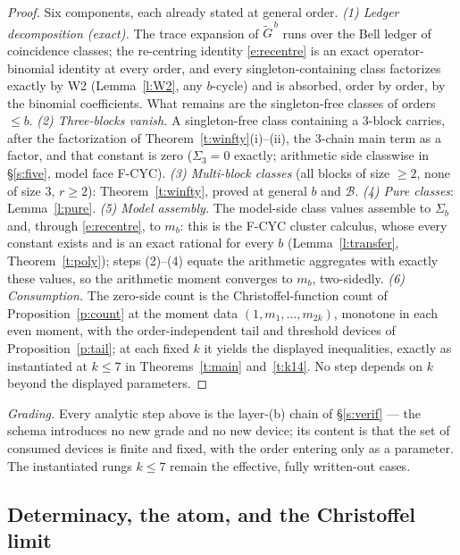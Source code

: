 \documentclass[11pt]{article}
\numberwithin{equation}{section}
\theoremstyle{definition}
\theoremstyle{remark}
\begin{document}
\begin{proof}
Six components, each already stated at general order.
\emph{(1) Ledger decomposition (exact).} The trace expansion
of $\widetilde G^{\,b}$ runs over the Bell ledger of
coincidence classes; the re-centring identity
\eqref{e:recentre} is an exact operator-binomial identity at
every order, and every singleton-containing class factorizes
exactly by W2 (Lemma~\ref{l:W2}, any $b$-cycle) and is
absorbed, order by order, by the binomial coefficients. What
remains are the singleton-free classes of orders $\le b$.
\emph{(2) Three-blocks vanish.} A singleton-free class
containing a $3$-block carries, after the factorization of
Theorem~\ref{t:winfty}(i)--(ii), the $3$-chain main term as
a factor, and that constant is zero ($\Sigma_3=0$ exactly;
arithmetic side classwise in \S\ref{s:five}, model face
F-CYC). \emph{(3) Multi-block classes} (all blocks of size
$\ge2$, none of size $3$, $r\ge2$): Theorem~\ref{t:winfty},
proved at general $b$ and $\mathcal B$. \emph{(4) Pure
classes}: Lemma~\ref{l:pure}. \emph{(5) Model assembly.}
The model-side class values assemble to $\Sigma_b$ and,
through \eqref{e:recentre}, to $m_b$: this is the F-CYC
cluster calculus, whose every constant exists and is an
exact rational for every $b$ (Lemma~\ref{l:transfer},
Theorem~\ref{t:poly}); steps (2)--(4) equate the arithmetic
aggregates with exactly these values, so the arithmetic
moment converges to $m_b$, two-sidedly. \emph{(6)
Consumption.} The zero-side count is the
Christoffel-function count of Proposition~\ref{p:count} at
the moment data $(1,m_1,\dots,m_{2k})$, monotone in each
even moment, with the order-independent tail and threshold
devices of Proposition~\ref{p:tail}; at each fixed $k$ it
yields the displayed inequalities, exactly as instantiated
at $k\le7$ in Theorems~\ref{t:main} and~\ref{t:k14}. No
step depends on $k$ beyond the displayed parameters.
\end{proof}

\noindent\emph{Grading.} Every analytic step above is the
layer-(b) chain of \S\ref{s:verif} --- the schema introduces
no new grade and no new device; its content is that the set
of consumed devices is finite and fixed, with the order
entering only as a parameter. The instantiated rungs
$k\le7$ remain the effective, fully written-out cases.

\subsection{Determinacy, the atom, and the Christoffel
limit}\label{s:soft}
\end{document}
